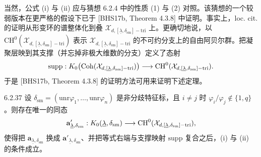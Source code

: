 当然，公式 (i) 与 (ii) 应与猜想 6.2.4 中的性质 (1) 与 (2) 对照。该猜想的一个较弱版本在更严格的假设下已于 [BHS17b, Theorem 4.3.8] 中证明。事实上，loc. cit. 的证明从形变环的谱整体化到叠 $\mathcal X_{d,[\underline\lambda,\delta_{\mathrm{sm}}]-\mathrm{tri}}$ 上。更确切地说，以 $\mathrm{CH}^0(\mathcal X_{d,[\underline\lambda,\delta_{\mathrm{sm}}]-\mathrm{tri}})$ 表示 $\mathcal X_{d,[\underline\lambda,\delta_{\mathrm{sm}}]-\mathrm{tri}}$ 的不可约分支上的自由阿贝尔群。把凝聚层映到其支撑（并忘掉非极大维数的分支）定义了态射
\[
\mathrm{supp}:K_0\bigl(\operatorname{Coh}(\mathcal X_{d,[\underline\lambda,\delta_{\mathrm{sm}}]-\mathrm{tri}})\bigr)
\longrightarrow\mathrm{CH}^0(\mathcal X_{d,[\underline\lambda,\delta_{\mathrm{sm}}]-\mathrm{tri}}).
\]
于是 [BHS17b, Theorem 4.3.8] 的证明方法可用来证明下述定理。

\begin{thm}{6.2.37}\label{thm:a4-6-2-37}
设 $\delta_{\mathrm{sm}}=(\mathrm{unr}\varphi_1,\dots,\mathrm{unr}\varphi_n)$ 是非分歧特征标，且 $i\neq j$ 时 $\varphi_i/\varphi_j\notin\{1,q\}$。则存在唯一的同态
\[
\mathbf a'_{\underline\lambda,\delta_{\mathrm{sm}}}:
K_0(\underline\lambda,\delta_{\mathrm{sm}})\longrightarrow
\mathrm{CH}^0(\mathcal X_{d,[\underline\lambda,\delta_{\mathrm{sm}}]-\mathrm{tri}}),
\]
使得把 $\mathbf a_{\underline\lambda,\delta_{\mathrm{sm}}}$ 换成 $\mathbf a'_{\underline\lambda,\delta_{\mathrm{sm}}}$、并把等式右端与支撑映射 $\mathrm{supp}$ 复合之后，(i) 与 (ii) 的条件成立。
\end{thm}

